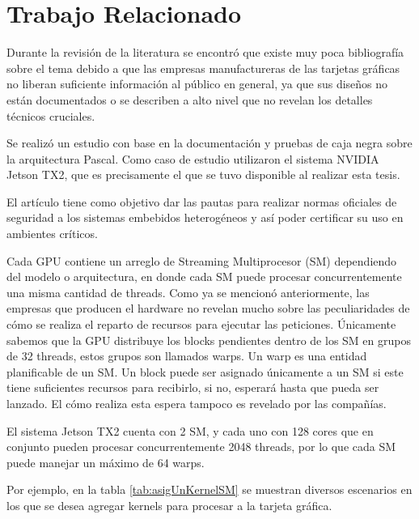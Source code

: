  \chapter{Trabajo Relacionado}
    \label{cha:TrabajoRelacionado}
   
  Durante la revisión de la literatura se encontró que existe muy poca bibliografía sobre el tema debido a que las empresas manufactureras de las tarjetas gráficas no liberan suficiente información al público en general, ya que sus diseños no están documentados o se describen a alto nivel que no revelan los detalles técnicos cruciales.
\newline

Se realizó un estudio\cite{TX2-H} con base en la documentación y pruebas de caja negra sobre la arquitectura Pascal. Como caso de estudio utilizaron el sistema NVIDIA Jetson TX2, que es precisamente el que se tuvo disponible al realizar esta tesis.
\newline

El artículo tiene como objetivo dar las pautas para realizar normas oficiales de seguridad a los sistemas embebidos heterogéneos y así poder certificar su uso en ambientes críticos. 
\newline

Cada GPU contiene un arreglo de Streaming Multiprocesor (SM) dependiendo del modelo o arquitectura, en donde cada SM puede procesar concurrentemente una misma cantidad de threads. Como ya se mencionó anteriormente, las empresas que producen el hardware no revelan mucho sobre las peculiaridades de cómo se realiza el reparto de recursos para ejecutar las peticiones. Únicamente sabemos que la GPU distribuye los blocks pendientes dentro de los SM en grupos de 32 threads, estos grupos son llamados warps. Un warp es una entidad planificable de un SM.
Un block puede ser asignado únicamente a un SM si este tiene suficientes recursos para recibirlo, si no, esperará hasta que pueda ser lanzado. El cómo realiza esta espera tampoco es revelado por las compañías.
\newline

El sistema Jetson TX2 cuenta con 2 SM, y cada uno con 128 cores que en conjunto pueden procesar concurrentemente 2048 threads\cite{SMJetson}, por lo que cada SM puede manejar un máximo de 64 warps.
\newline

Por ejemplo, en la tabla \ref{tab:asigUnKernelSM} se muestran diversos escenarios en los que se desea agregar kernels para procesar a la tarjeta gráfica.
\newline


